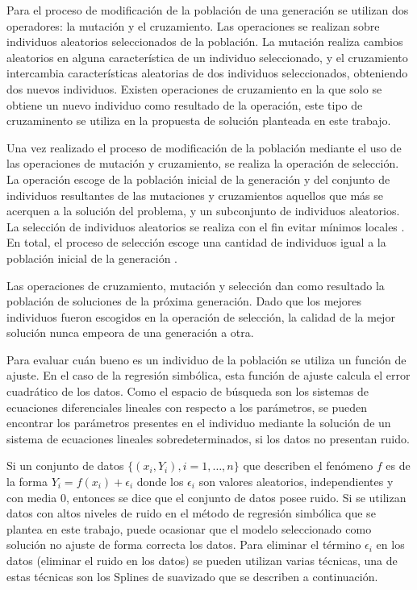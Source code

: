 Para el proceso de modificación de la población de una generación se utilizan dos operadores: la mutación y el cruzamiento. Las operaciones se realizan sobre individuos aleatorios seleccionados de la población. La mutación realiza cambios aleatorios en alguna característica de un individuo seleccionado, y el cruzamiento intercambia características aleatorias de dos individuos seleccionados, obteniendo dos nuevos individuos. Existen operaciones de cruzamiento en la que solo se obtiene un nuevo individuo como resultado de la operación, este tipo de cruzaminento se utiliza en la propuesta de solución planteada en este trabajo.

Una vez realizado el proceso de modificación de la población mediante el uso de las operaciones de mutación y cruzamiento, se realiza la operación de selección. La operación escoge de la población inicial de la generación y del conjunto de individuos resultantes de las mutaciones y cruzamientos aquellos que más se acerquen a la solución del problema, y un subconjunto de individuos aleatorios. La selección de individuos aleatorios se realiza con el fin evitar mínimos locales \cite{mitchell1998introduction}. En total, el proceso de selección escoge una cantidad de individuos igual a la población inicial de la generación \cite{mitchell1998introduction}.

Las operaciones de cruzamiento, mutación y selección dan como resultado la población de soluciones de la próxima generación. Dado que los mejores individuos fueron escogidos en la operación de selección, la calidad de la mejor solución nunca empeora de una generación a otra.

Para evaluar cuán bueno es un individuo de la población se utiliza un función de ajuste. En el caso de la regresión simbólica, esta función de ajuste calcula el error cuadrático de los datos. Como el espacio de búsqueda son los sistemas de ecuaciones diferenciales lineales con respecto a los parámetros, se pueden encontrar los parámetros presentes en el individuo mediante la solución de un sistema de ecuaciones lineales sobredeterminados, si los datos no presentan ruido.

Si un conjunto de datos $\{(x_i, Y_i), i=1, \dots, n\}$ que describen el fenómeno $f$ es de la forma $Y_i = f(x_i) + \epsilon _i$ donde los $\epsilon _i$ son valores aleatorios, independientes y con media 0, entonces se dice que el conjunto de datos posee ruido. Si se utilizan datos con altos niveles de ruido en el método de regresión simbólica que se plantea en este trabajo, puede ocasionar que el modelo seleccionado como solución no ajuste de forma correcta los datos. Para eliminar el término $\epsilon _i$ en los datos (eliminar el ruido en los datos) se pueden utilizan varias técnicas, una de estas técnicas son los Splines de suavizado que se describen a continuación.

